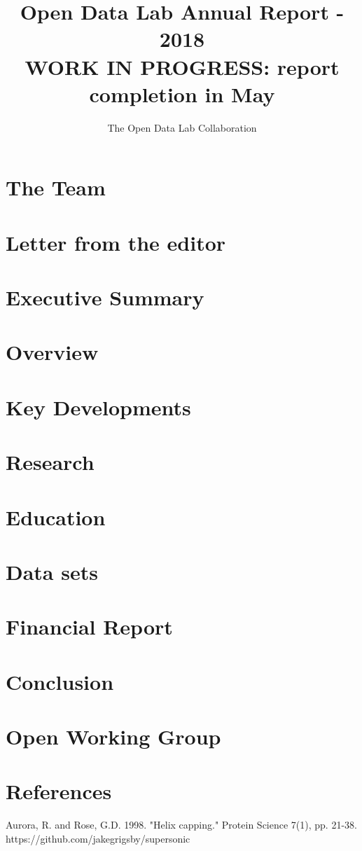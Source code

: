 \documentclass[12pt,letterpaper]{report} %
\title{Open Data Lab Annual Report - 2018\\
\large WORK IN PROGRESS: report completion in May }
\author{The Open Data Lab Collaboration}
\begin{document}
\maketitle
\chapter*{The Team}   %
\chapter*{Letter from the editor}   %
\chapter{Executive Summary}
\tableofcontents
\chapter{Overview} 
\chapter{Key Developments} 
\chapter{Research} 
\chapter{Education} 
\chapter{Data sets} 	
\chapter{Financial Report} 
\chapter{Conclusion}

\appendix
\chapter{Open Working Group}\label{chap:owg}
 

\chapter{References}
\begin{thebibliography}{99}
 Aurora, R. and Rose, G.D. 1998. "Helix capping." Protein Science 7(1), pp. 21-38.
 https://github.com/jakegrigsby/supersonic
\end{thebibliography}
\end{document}
